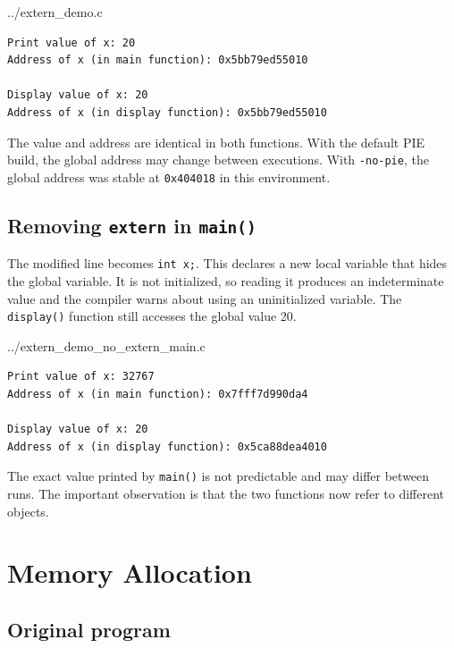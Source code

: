 \documentclass[12pt,a4paper]{article}
\begin{document}

{../extern_demo.c}

\begin{lstlisting}[style=terminal,caption={Original extern output}]
Print value of x: 20
Address of x (in main function): 0x5bb79ed55010

Display value of x: 20
Address of x (in display function): 0x5bb79ed55010
\end{lstlisting}

The value and address are identical in both functions. With the default PIE
build, the global address may change between executions. With \texttt{-no-pie},
the global address was stable at \texttt{0x404018} in this environment.

\subsection{Removing \texttt{extern} in \texttt{main()}}

The modified line becomes \texttt{int x;}. This declares a new local variable
that hides the global variable. It is not initialized, so reading it produces
an indeterminate value and the compiler warns about using an uninitialized
variable. The \texttt{display()} function still accesses the global value 20.


{../extern_demo_no_extern_main.c}

\begin{lstlisting}[style=terminal,caption={Output after removing extern in main}]
Print value of x: 32767
Address of x (in main function): 0x7fff7d990da4

Display value of x: 20
Address of x (in display function): 0x5ca88dea4010
\end{lstlisting}

The exact value printed by \texttt{main()} is not predictable and may differ
between runs. The important observation is that the two functions now refer to
different objects.

\section{Memory Allocation}

\subsection{Original program}
\end{document}
